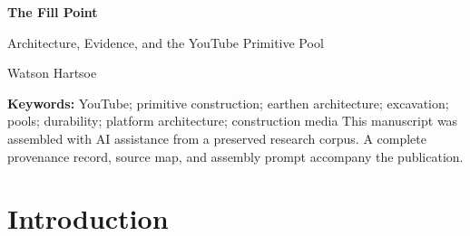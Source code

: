 \documentclass[11pt]{article}
\begin{document}
\begin{titlepage}
\vspace*{1.5cm}
{\Huge\bfseries The Fill Point\par}
\vspace{0.35cm}
{\Large Architecture, Evidence, and the YouTube Primitive Pool\par}
\vspace{1.2cm}
{\large Watson Hartsoe\par}
\vfill
\begin{abstract}
Viral ``primitive construction'' videos frequently culminate in the filling of a carved earthen pool. This essay argues that the fill is not merely a visual climax. It is a technical threshold that changes what the object must be able to do and therefore what evidence becomes relevant. Before water, a finished basin can be judged primarily as geometry: a void has been excavated, trimmed, and surfaced. After water, the same object makes claims about material composition, erosion resistance, cracking, retention, drainage, and duration. Research on rock-cut architecture shows that subtractive building depends on the material properties of the excavated context, while research on earthen construction shows that water exposure and long-term weathering are decisive to durability. Read against these literatures, the genre's recurrent narrative endpoint becomes architecturally peculiar: the videos often stop at the moment when a building would begin accumulating its strongest performance evidence. I call this the \emph{fill point}. The concept shifts criticism away from the exhausted binary of ``real'' versus ``fake'' and toward a forensic architectural question: which operations are visible because they produce the image of completion, and which technical systems remain unresolved because their evidence would only appear after completion?
\end{abstract}

\textbf{Keywords:} YouTube; primitive construction; earthen architecture; excavation; pools; durability; platform architecture; construction media
\vfill
{\footnotesize This manuscript was assembled with AI assistance from a preserved research corpus. A complete provenance record, source map, and assembly prompt accompany the publication.}
\end{titlepage}

\section{Introduction}
\end{document}
